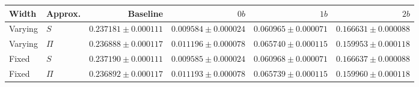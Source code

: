 \begin{tabular}{llrrrr}
\toprule
Width & Approx. & Baseline & $0b$ & $1b$ & $2b$ \\
\midrule
Varying & $S$ & $0.237181\pm0.000111$ & $0.009584\pm0.000024$ & $0.060965\pm0.000071$ & $0.166631\pm0.000088$ \\
Varying & $\Pi$ & $0.236888\pm0.000117$ & $0.011196\pm0.000078$ & $0.065740\pm0.000115$ & $0.159953\pm0.000118$ \\
Fixed & $S$ & $0.237190\pm0.000111$ & $0.009585\pm0.000024$ & $0.060968\pm0.000071$ & $0.166637\pm0.000088$ \\
Fixed & $\Pi$ & $0.236892\pm0.000117$ & $0.011193\pm0.000078$ & $0.065739\pm0.000115$ & $0.159960\pm0.000118$ \\
\bottomrule
\end{tabular}
